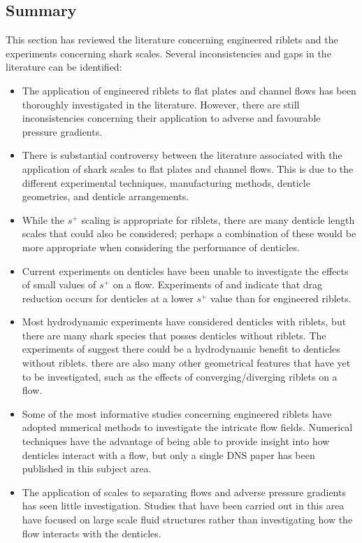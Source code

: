 \documentclass[12pt,oneside,a4paper]{article}
\begin{document}
\subsection{Summary}
This section has reviewed the literature concerning engineered riblets and the experiments concerning shark scales. Several inconsistencies and gaps in the literature can be identified:
\begin{itemize}
%
\item The application of engineered riblets to flat plates and channel flows has been thoroughly investigated in the literature. However, there are still inconsistencies concerning their application to adverse and favourable pressure gradients. 
%
\item There is substantial controversy between the literature associated with the application of shark scales to flat plates and channel flows. This is due to the different experimental techniques, manufacturing methods, denticle geometries, and denticle arrangements.
%
\item While the $s^+$ scaling is appropriate for riblets, there are many denticle length scales that could also be considered; perhaps a combination of these would be more appropriate when considering the performance of denticles. 
%
\item Current experiments on denticles have been unable to investigate the effects of small values of $s^+$ on a flow. Experiments of \cite{bechert1985} and \cite{wen2014,wen2015} indicate that drag reduction occurs for denticles at a lower $s^+$ value than for engineered riblets.
%
\item Most hydrodynamic experiments have considered denticles with riblets, but there are many shark species that posses denticles without riblets. The experiments of \cite{fletcher2014phd} suggest there could be a hydrodynamic benefit to denticles without riblets. there are also many other geometrical features that have yet to be investigated, such as the effects of converging/diverging riblets on a flow. 
%
\item Some of the most informative studies concerning engineered riblets have adopted numerical methods to investigate the intricate flow fields. Numerical techniques have the advantage of being able to provide insight into how denticles interact with a flow, but only a single DNS paper has been published in this subject area. 
%
\item The application of scales to separating flows and adverse pressure gradients has seen little investigation. Studies that have been carried out in this area have focused on large scale fluid structures rather than investigating how the flow interacts with the denticles.

\end{itemize}
\end{document}
